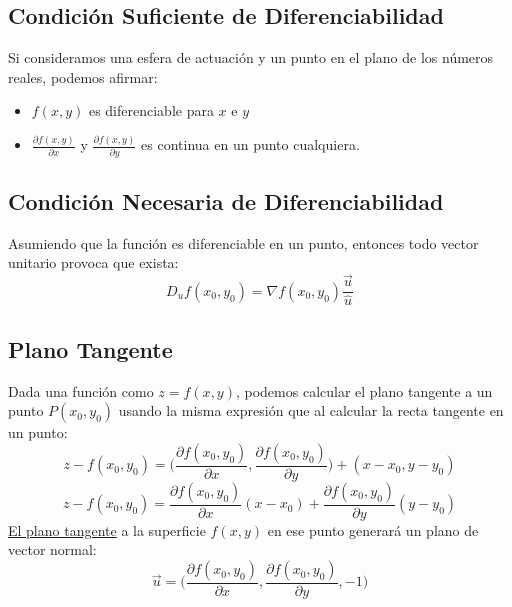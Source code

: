 \subsection{Condición Suficiente de Diferenciabilidad}
\noindent Si consideramos una esfera de actuación y un punto en el plano de los números reales, podemos afirmar:
\begin{itemize}
        \item \(f(x,y)\) es diferenciable para \(x\) e \(y\)
        \item \(\frac{\partial f(x,y)}{\partial x} \) y \(\frac{\partial f(x,y)}{\partial y} \) es continua en un punto cualquiera.
\end{itemize}
\subsection{Condición Necesaria de Diferenciabilidad}
\noindent Asumiendo que la función es diferenciable en un punto, entonces todo vector unitario provoca que exista:
\[
        \boxed{D_uf(x_0,y_0)=\nabla f(x_0,y_0)\frac{\vec{u}}{\hat{u}}}
\]
\subsection{Plano Tangente}
\noindent Dada una función como \(z = f(x,y)\), podemos calcular el plano tangente a un punto \(P(x_0,y_0)\) usando la misma expresión que al calcular la recta tangente en un punto:
\[
        z- f(x_0,y_0) = \Big( \frac{\partial f(x_0,y_0)}{\partial x}, \frac{\partial f(x_0,y_0)}{\partial y}\Big) + (x-x_0, y-y_0)
\]
\[
        \boxed{z- f(x_0,y_0) = \frac{\partial f(x_0,y_0)}{\partial x}(x-x_0)+ \frac{\partial f(x_0,y_0)}{\partial y}(y-y_0)}
\]
\noindent \underline{El plano tangente} a la superficie \(f(x,y)\) en ese punto generará un plano de vector normal:
\[
        \boxed{\vec{u} = \Big(\frac{\partial f(x_0,y_0)}{\partial x},\frac{\partial f(x_0,y_0)}{\partial y},-1\Big)}
\]

